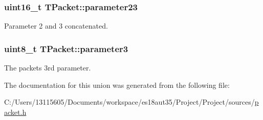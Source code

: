 \subsubsection[{parameter23}]{\setlength{\rightskip}{0pt plus 5cm}uint16\+\_\+t T\+Packet\+::parameter23}\label{union_t_packet_a92905f7e01f01bd1439dc4668b6808c1}
Parameter 2 and 3 concatenated. \hypertarget{union_t_packet_ab3ac2f9a6cfe5b6a7ae0987d21de472b}{}
\subsubsection[{parameter3}]{\setlength{\rightskip}{0pt plus 5cm}uint8\+\_\+t T\+Packet\+::parameter3}\label{union_t_packet_ab3ac2f9a6cfe5b6a7ae0987d21de472b}
The packet\textquotesingle{}s 3rd parameter. 

The documentation for this union was generated from the following file\+:\begin{DoxyCompactItemize}
\item 
C\+:/\+Users/13115605/\+Documents/workspace/es18aut35/\+Project/\+Project/sources/\hyperlink{packet_8h}{packet.\+h}\end{DoxyCompactItemize}
